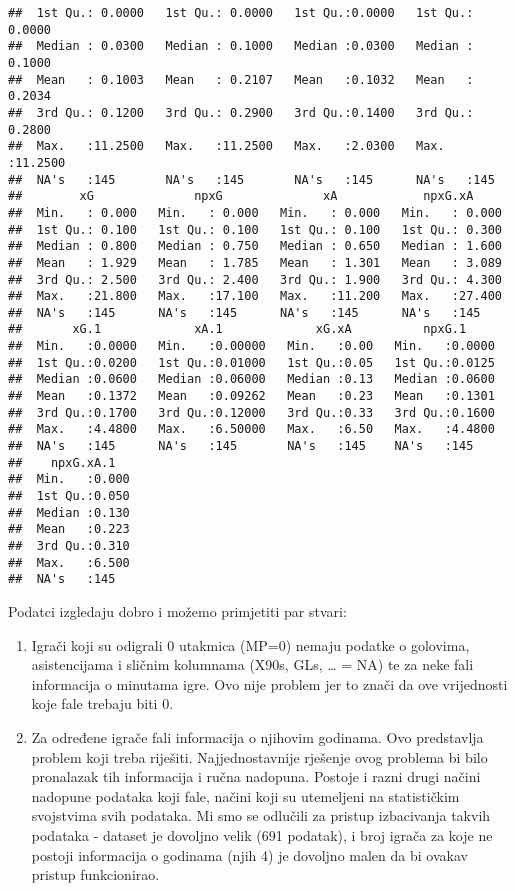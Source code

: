 \documentclass[
]{article}
\providecommand{\tightlist}{%
  \setlength{\itemsep}{0pt}\setlength{\parskip}{0pt}}
\begin{document}
\begin{verbatim}
##  1st Qu.: 0.0000   1st Qu.: 0.0000   1st Qu.:0.0000   1st Qu.: 0.0000  
##  Median : 0.0300   Median : 0.1000   Median :0.0300   Median : 0.1000  
##  Mean   : 0.1003   Mean   : 0.2107   Mean   :0.1032   Mean   : 0.2034  
##  3rd Qu.: 0.1200   3rd Qu.: 0.2900   3rd Qu.:0.1400   3rd Qu.: 0.2800  
##  Max.   :11.2500   Max.   :11.2500   Max.   :2.0300   Max.   :11.2500  
##  NA's   :145       NA's   :145       NA's   :145      NA's   :145      
##        xG              npxG              xA            npxG.xA      
##  Min.   : 0.000   Min.   : 0.000   Min.   : 0.000   Min.   : 0.000  
##  1st Qu.: 0.100   1st Qu.: 0.100   1st Qu.: 0.100   1st Qu.: 0.300  
##  Median : 0.800   Median : 0.750   Median : 0.650   Median : 1.600  
##  Mean   : 1.929   Mean   : 1.785   Mean   : 1.301   Mean   : 3.089  
##  3rd Qu.: 2.500   3rd Qu.: 2.400   3rd Qu.: 1.900   3rd Qu.: 4.300  
##  Max.   :21.800   Max.   :17.100   Max.   :11.200   Max.   :27.400  
##  NA's   :145      NA's   :145      NA's   :145      NA's   :145     
##       xG.1             xA.1             xG.xA          npxG.1      
##  Min.   :0.0000   Min.   :0.00000   Min.   :0.00   Min.   :0.0000  
##  1st Qu.:0.0200   1st Qu.:0.01000   1st Qu.:0.05   1st Qu.:0.0125  
##  Median :0.0600   Median :0.06000   Median :0.13   Median :0.0600  
##  Mean   :0.1372   Mean   :0.09262   Mean   :0.23   Mean   :0.1301  
##  3rd Qu.:0.1700   3rd Qu.:0.12000   3rd Qu.:0.33   3rd Qu.:0.1600  
##  Max.   :4.4800   Max.   :6.50000   Max.   :6.50   Max.   :4.4800  
##  NA's   :145      NA's   :145       NA's   :145    NA's   :145     
##    npxG.xA.1    
##  Min.   :0.000  
##  1st Qu.:0.050  
##  Median :0.130  
##  Mean   :0.223  
##  3rd Qu.:0.310  
##  Max.   :6.500  
##  NA's   :145
\end{verbatim}

Podatci izgledaju dobro i možemo primjetiti par stvari:

\begin{enumerate}
\def\labelenumi{\arabic{enumi}.}
\tightlist
\item
  Igrači koji su odigrali 0 utakmica (MP=0) nemaju podatke o golovima,
  asistencijama i sličnim kolumnama (X90s, GLs, \ldots{} = NA) te za
  neke fali informacija o minutama igre. Ovo nije problem jer to znači
  da ove vrijednosti koje fale trebaju biti 0.
\item
  Za određene igrače fali informacija o njihovim godinama. Ovo
  predstavlja problem koji treba riješiti. Najjednostavnije rješenje
  ovog problema bi bilo pronalazak tih informacija i ručna nadopuna.
  Postoje i razni drugi načini nadopune podataka koji fale, načini koji
  su utemeljeni na statističkim svojstvima svih podataka. Mi smo se
  odlučili za pristup izbacivanja takvih podataka - dataset je dovoljno
  velik (691 podatak), i broj igrača za koje ne postoji informacija o
  godinama (njih 4) je dovoljno malen da bi ovakav pristup funkcionirao.
\end{enumerate}
\end{document}
